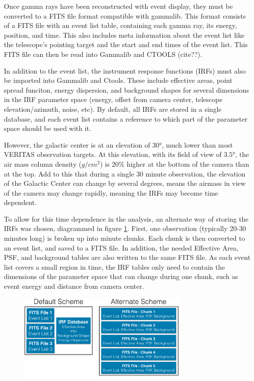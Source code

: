 Once gamma rays have been reconstructed with event display, they must be converted to a FITS file format compatible with gammalib.
This format consists of a FITS file with an event list table, containing each gamma ray, its energy, position, and time.
This also includes meta information about the event list like the telescope's pointing target and the start and end times of the event list.
This FITS file can then be read into Gammalib and CTOOLS (cite??).

In addition to the event list, the instrument response functions (IRFs) must also be imported into Gammalib and Ctools.
These include effective areas, point spread funciton, energy dispersion, and background shapes for several dimensions in the IRF parameter space (energy, offset from camera center, telescope elevation/azimuth, noise, etc).
By default, all IRFs are stored in a single database, and each event list contains a reference to which part of the parameter space should be used with it.

However, the galactic center is at an elevation of $\ang{30}$, much lower than most VERITAS observation targets.
At this elevation, with its field of view of $\ang{3.5}$, the air mass column density ($g/cm^{2}$) is 20\% higher at the bottom of the camera than at the top.
Add to this that during a single 30 minute observation, the elevation of the Galactic Center can change by several degrees, means the airmass in view of the camera may change rapidly, meaning the IRFs may become time dependent.

To allow for this time dependence in the analysis, an alternate way of storing the IRFs was chosen, diagrammed in figure \ref{fig:fits_scheme}.
First, one observation (typically 20-30 minutes long) is broken up into  minute chunks.
Each chunk is then converted to an event list, and saved to a FITS file.
In addition, the needed Effective Area, PSF, and background tables are also written to the same FITS file.
As each event list covers a small region in time, the IRF tables only need to contain the dimensions of the parameter space that can change during one chunk, such as event energy and distance from camera center.

\begin{figure}[ht]
  \begin{center}
    \includegraphics[width=0.75\textwidth]{images/FITS_diagrams_alternate_scheme.eps}
    \caption[FITS File Event Storage Schemes]{}\label{fig:fits_scheme}
  \end{center}
\end{figure}

